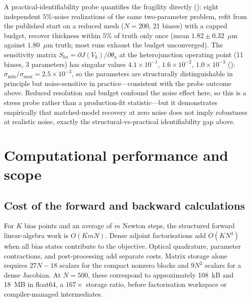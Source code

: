 A practical-identifiability probe quantifies the fragility directly
(): eight independent
$5\%$-noise realizations of the same two-parameter problem, refit from
the published start on a reduced mesh ($N=200$, 21 biases) with a capped
budget, recover thickness within $5\%$ of truth only once (mean
$1.82\pm0.32$~$\mu$m against $1.80$~$\mu$m truth; most runs exhaust the
budget unconverged). The sensitivity matrix
$S_{ka}=\partial J(V_k)/\partial\theta_a$ at the heterojunction
operating point (11 biases, 3 parameters) has singular values
$4.1\times10^{-1}$, $1.6\times10^{-2}$, $1.0\times10^{-3}$
():
$\sigma_{\min}/\sigma_{\max}=2.5\times10^{-3}$, so the parameters are
structurally distinguishable in principle but noise-sensitive in
practice---consistent with the probe outcome above. Reduced resolution and budget confound the noise
effect here, so this is a stress probe rather than a production-fit
statistic---but it demonstrates empirically that matched-model recovery
at zero noise does not imply robustness at realistic noise, exactly the
structural-vs-practical identifiability gap above.


\section{Computational performance and scope}\label{sec:performance}
\subsection{Cost of the forward and backward calculations}
For $K$ bias points and an average of $m$ Newton steps, the structured
forward linear-algebra work is $O(KmN)$. Dense adjoint factorisations add
$O(KN^3)$ when all bias states contribute to the objective. Optical
quadrature, parameter contractions, and post-processing add separate
costs. Matrix storage alone requires $27N-18$ scalars for the compact
nonzero blocks and $9N^2$ scalars for a dense Jacobian. At $N=500$,
these correspond to approximately 108~kB and 18~MB in float64, a
$167\times$ storage ratio, before factorisation workspace or
compiler-managed intermediates.

